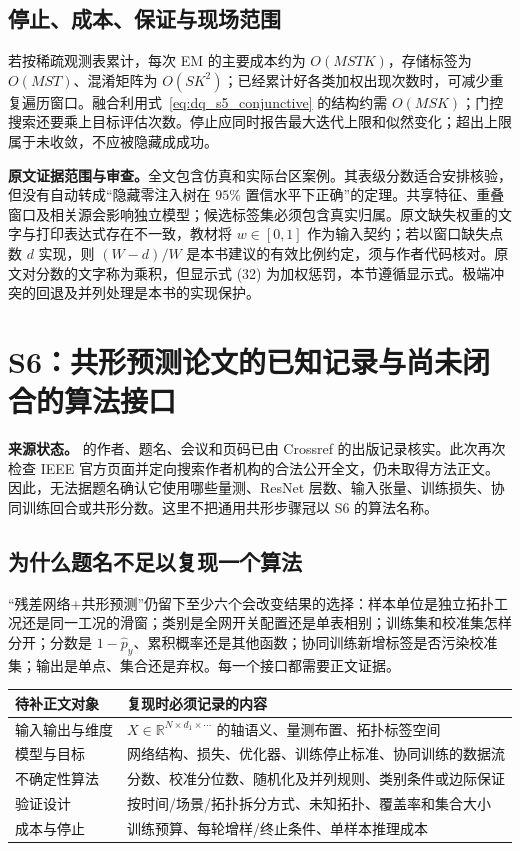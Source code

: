 \documentclass[UTF8,11pt,fontset=fandol,openany,oneside]{ctexbook}
\newcommand{\R}{\mathbb{R}}
\theoremstyle{definition}
\theoremstyle{remark}
\numberwithin{equation}{chapter}
\begin{document}
\subsection{停止、成本、保证与现场范围}

若按稀疏观测表累计，每次 EM 的主要成本约为 $O(MSTK)$，存储标签为 $O(MST)$、混淆矩阵为 $O(SK^2)$；已经累计好各类加权出现次数时，可减少重复遍历窗口。融合利用式~\eqref{eq:dq_s5_conjunctive} 的结构约需 $O(MSK)$；门控搜索还要乘上目标评估次数。停止应同时报告最大迭代上限和似然变化；超出上限属于未收敛，不应被隐藏成成功。

\textbf{原文证据范围与审查。}全文包含仿真和实际台区案例。其表级分数适合安排核验，但没有自动转成“隐藏零注入树在 $95\%$ 置信水平下正确”的定理。共享特征、重叠窗口及相关源会影响独立模型；候选标签集必须包含真实归属。原文缺失权重的文字与打印表达式存在不一致，教材将 $w\in[0,1]$ 作为输入契约；若以窗口缺失点数 $d$ 实现，则 $(W-d)/W$ 是本书建议的有效比例约定，须与作者代码核对。原文对分数的文字称为乘积，但显示式 (32) 为加权惩罚，本节遵循显示式。极端冲突的回退及并列处理是本书的实现保护。

\section{S6：共形预测论文的已知记录与尚未闭合的算法接口}
\label{sec:dq_s6}

\textbf{来源状态。}\citet{S6} 的作者、题名、会议和页码已由 Crossref 的出版记录核实。此次再次检查 IEEE 官方页面并定向搜索作者机构的合法公开全文，仍未取得方法正文。因此，无法据题名确认它使用哪些量测、ResNet 层数、输入张量、训练损失、协同训练回合或共形分数。这里不把通用共形步骤冠以 S6 的算法名称。

\subsection{为什么题名不足以复现一个算法}

“残差网络+共形预测”仍留下至少六个会改变结果的选择：样本单位是独立拓扑工况还是同一工况的滑窗；类别是全网开关配置还是单表相别；训练集和校准集怎样分开；分数是 $1-\hat p_y$、累积概率还是其他函数；协同训练新增标签是否污染校准集；输出是单点、集合还是弃权。每一个接口都需要正文证据。

\begin{center}
\begin{tabularx}{\textwidth}{@{}lX@{}}
\toprule
待补正文对象 & 复现时必须记录的内容 \\
\midrule
输入输出与维度 & $X\in\R^{N\times d_1\times\cdots}$ 的轴语义、量测布置、拓扑标签空间 \\
模型与目标 & 网络结构、损失、优化器、训练停止标准、协同训练的数据流 \\
不确定性算法 & 分数、校准分位数、随机化及并列规则、类别条件或边际保证 \\
验证设计 & 按时间/场景/拓扑拆分方式、未知拓扑、覆盖率和集合大小 \\
成本与停止 & 训练预算、每轮增样/终止条件、单样本推理成本 \\
\bottomrule
\end{tabularx}
\end{center}
\end{document}

